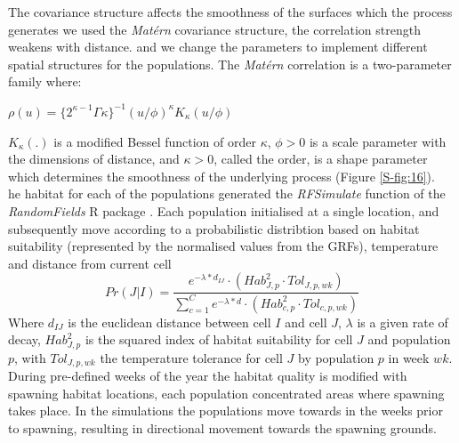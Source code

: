 \documentclass[review]{elsarticle}
\begin{document}
The covariance structure affects the smoothness of the surfaces which the
process generates we used the \textit{Matérn}
covariance structure,
 the correlation strength weakens with
distance.
 and we change the parameters to
implement different spatial structures for the populations. The \textit{Matérn}
correlation is a two-parameter family where: 
	\begin{center}
		$\rho(u) = \{2^{\kappa -
			1}\Gamma{\kappa}\}^{-1}(u/\phi)^{\kappa}K_{\kappa}(u/\phi)$
	\end{center}
$K_{\kappa}(.)$ is a modified Bessel function of order $\kappa$, $\phi >
0$ is a scale parameter with the dimensions of distance, and $\kappa > 0$,
called the order, is a shape parameter which determines the smoothness of the
underlying process (Figure \ref{S-fig:16}). \\

he habitat for each of the
populations  generated 
the \textit{RFSimulate} function of the \textit{RandomFields} R package
\citep{Schlater2015}. Each population  initialised at
a single location, and subsequently move according to a
probabilistic distribtion based on habitat suitability
(represented by the normalised values from the GRFs), temperature and distance
from current cell 
\begin{equation}
	Pr(J | I) = \frac{e^{-\lambda * d_{IJ}} \cdot
		(Hab_{J,p}^2 \cdot Tol_{J,p,wk})}{\sum\limits_{c=1}^{C}e^{-\lambda * d} \cdot
		(Hab_{c,p}^2 \cdot Tol_{c,p,wk})}
\end{equation}
Where $d_{IJ}$ is the euclidean distance between cell $I$ and cell $J$,
$\lambda$ is a given rate of decay, $Hab_{J,p}^2$ is the squared index of
habitat suitability for cell $J$ and population $p$, with $Tol_{J,p,wk}$ the
temperature tolerance for cell $J$ by population $p$ in week $wk$.\\

During pre-defined weeks of the year the habitat quality is modified with
 spawning habitat locations,
 each population
 concentrated areas where spawning takes place. In
the simulations the populations move towards
 in the weeks prior to spawning, resulting
in directional movement towards the spawning grounds. \\
\end{document}
